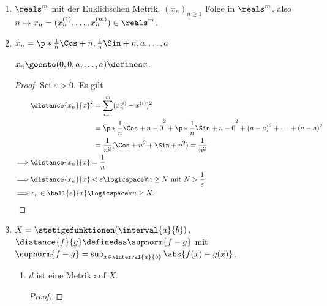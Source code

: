 \begin{beispiele}
    \begin{enumerate}
        \item \( \reals^m \) mit der Euklidischen Metrik. \( (x_n)_{n\geq 1} \) Folge in \( \reals^m \), also \( n\mapsto x_n=(x_n^{(1)},\ldots, x_n^{(m)})\in \reals^m \).
        \item \( x_n=\p*{ \frac{1}{n}\Cos+{n},\frac{1}{n}\Sin+{n},a,\ldots,a } \)
        \begin{behauptung*}
            \( x_n\goesto (0,0,a,\ldots,a)\defines x \).
        \end{behauptung*}
        \begin{proof}
            Sei \( \varepsilon>0 \). Es gilt
            \begin{align*}
                &\distance{x_n}{x}^2 \begin{aligned}[t] 
                    &=\sum\limits_{i=1}^{m} (x_n^{(i)}-x^{(i)})^2\\
                    &=\p*{ \frac{1}{n}\Cos+{n}-0 }^2+\p*{ \frac{1}{n}\Sin+{n}-0 }^2+(a-a)^2+\cdots +(a-a)^2\\
                    &=\frac{1}{n^2}(\Cos+{n}^2+\Sin+{n}^2)=\frac{1}{n^2}
                \end{aligned}\\
                \implies &\distance{x_n}{x}=\frac{1}{n}\\
                \implies &\distance{x_n}{x}<\varepsilon\logicspace\forall n\geq N\text{ mit } N>\frac{1}{\varepsilon}\\
                \implies &x_n \in \ball{\varepsilon}{x} \logicspace\forall n \geq N.
            \end{align*}            
        \end{proof}
        
        \item \( X=\stetigefunktionen(\interval{a}{b}) \), \( \distance{f}{g}\definedas \supnorm{f-g} \) mit \( \supnorm{f-g}=\sup_{x\in \interval{a}{b}}\abs{f(x)-g(x)} \).
        \begin{enumerate}[label=\textbf{\arabic*. Beh}]
            \item \( d \) ist eine Metrik auf \( X \).
            \begin{proof}
\end{proof}
\end{enumerate}
\end{enumerate}
\end{beispiele}
